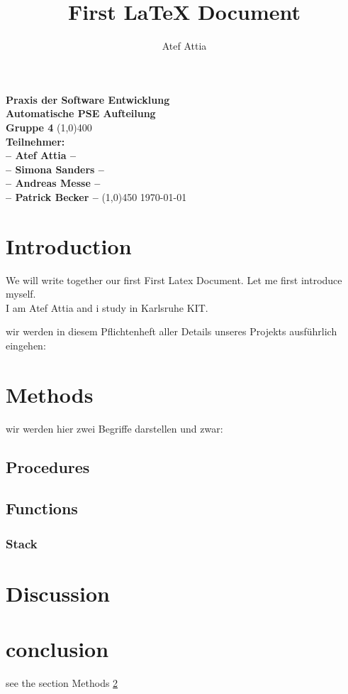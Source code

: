 \documentclass[parskip=full]{scrartcl}
\title{First LaTeX Document}
\author{Atef Attia}
\begin{document}
\begin{titlepage}
\begin{center}
\vspace*{1cm}
\Huge{\textbf{Praxis der Software Entwicklung\\ Automatische PSE Aufteilung\\ Gruppe 4}}
\vfill
\line(1,0){400}\\[2mm]
\huge{\textbf{Teilnehmer: }}\\
\Large{\textbf{-- Atef Attia --}}\\
\Large{\textbf{-- Simona Sanders --}}\\
\Large{\textbf{-- Andreas Messe --}}\\
\Large{\textbf{-- Patrick Becker --}}
\line(1,0){450}
\vfill
\today
\end{center}
\end{titlepage}


\section{Introduction}
\begin{large}
We will write together our first First Latex Document. Let me first introduce myself.\\
I am Atef Attia and i study in Karlsruhe KIT.

wir werden in diesem Pflichtenheft aller Details unseres Projekts ausführlich eingehen:
\begin{itemize}
\item \Large{Sequenzdiagramm}
\item \Large{Aktivitätsdiagramm)
\item \Large{Zustandsdiagramm)
\end{itemize}
\end{large}
\section{Methods}\label{sec:method}
\begin{large}
wir werden hier zwei Begriffe darstellen und zwar:\\
\end{large}
\subsection{Procedures}

\subsection{Functions}
\subsubsection {Stack}

\section{Discussion}


\section{conclusion}
see the section Methods \ref{sec:method}
\end{document}
